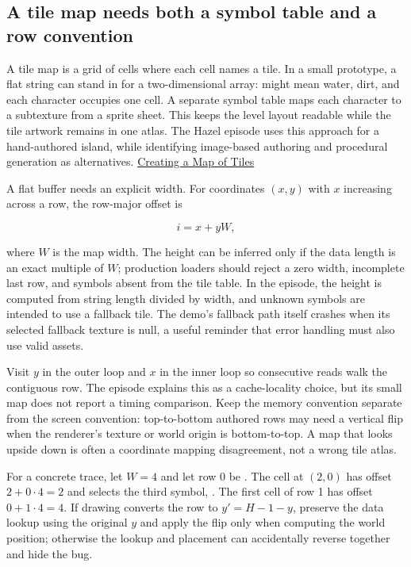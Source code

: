 \subsection{A tile map needs both a symbol table and a row convention}\label{06-engine-ii-ch026-a-tile-map-needs-both-a-symbol-table-and-a-row-convention}

\hypertarget{06-engine-ii-ch026-a-tile-map-needs-both-a-symbol-table-and-a-row-convention}{}

A tile map is a grid of cells where each cell names a tile. In a small prototype, a flat string can stand in for a two-dimensional array:  might mean water,  dirt, and each character occupies one cell. A separate symbol table maps each character to a subtexture from a sprite sheet. This keeps the level layout readable while the tile artwork remains in one atlas. The Hazel episode uses this approach for a hand-authored island, while identifying image-based authoring and procedural generation as alternatives. \href{https://www.youtube.com/watch?v=mj7qCwHTtK8}{Creating a Map of Tiles}

A flat buffer needs an explicit width. For coordinates \((x,y)\) with \(x\) increasing across a row, the row-major offset is

\[
 i = x + yW,
\]

where \(W\) is the map width. The height can be inferred only if the data length is an exact multiple of \(W\); production loaders should reject a zero width, incomplete last row, and symbols absent from the tile table. In the episode, the height is computed from string length divided by width, and unknown symbols are intended to use a fallback tile. The demo's fallback path itself crashes when its selected fallback texture is null, a useful reminder that error handling must also use valid assets.

Visit \(y\) in the outer loop and \(x\) in the inner loop so consecutive reads walk the contiguous row. The episode explains this as a cache-locality choice, but its small map does not report a timing comparison. Keep the memory convention separate from the screen convention: top-to-bottom authored rows may need a vertical flip when the renderer's texture or world origin is bottom-to-top. A map that looks upside down is often a coordinate mapping disagreement, not a wrong tile atlas.

For a concrete trace, let \(W=4\) and let row 0 be . The cell at \((2,0)\) has offset \(2+0\cdot4=2\) and selects the third symbol, . The first cell of row 1 has offset \(0+1\cdot4=4\). If drawing converts the row to \(y'=H-1-y\), preserve the data lookup using the original \(y\) and apply the flip only when computing the world position; otherwise the lookup and placement can accidentally reverse together and hide the bug.

